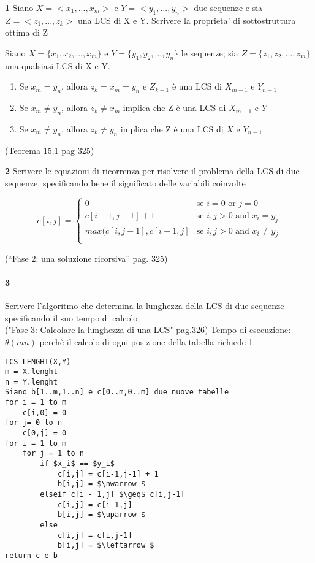 \documentclass[12pt, a4paper, openany]{book}
\newcommand{\domanda}[2]{\begin{box_domanda}\textbf{#1} #2\end{box_domanda}}
\newcommand{\risposta}[1]{#1}
\newcommand{\reflibro}[1]{(\small{#1})}
\begin{document}
\domanda{1}{
    Siano $X=<x_1,...,x_m>$ e $Y=< y_1,...,y_n>$ due sequenze e sia $Z=<z_1,...,z_k>$
    una LCS di X e Y. Scrivere la proprieta’ di sottostruttura ottima di Z    
}
\risposta{
    Siano $X=\{x_1,x_2,...,x_m\}$ e $Y=\{y_1,y_2,...,y_n\}$ le sequenze; sia $Z=\{z_1,z_2,...,z_m\}$ una qualsiasi LCS di X e Y.
\begin{enumerate}
    \item Se $x_m = y_n$, allora $z_k = x_m =y_n$ e $Z_{k-1}$ è  una LCS di $X_{m-1}$ e $Y_{n-1}$
    \item Se $x_m \neq y_n$, allora $z_k \neq x_m$ implica che Z è una LCS di $X_{m-1}$ e $Y$
    \item Se $x_m \neq y_n$, allora $z_k \neq y_n$ implica che Z è una LCS di $X$ e $Y_{n-1}$
\end{enumerate}
}

\reflibro{Teorema 15.1 pag 325}
\domanda{2}{
Scrivere le equazioni di ricorrenza per risolvere il problema della LCS di due
sequenze, specificando bene il significato delle variabili coinvolte 
}
\risposta{
\begin{equation*}
    c[i,j] = \begin{cases}
        0                      & \text{se $i = 0$ or $j = 0$}           \\
        c[i-1,j-1] + 1         & \text{se $i,j > 0$ and $x_i = y_j$}    \\
        max(c[i,j-1], c[i-1,j] & \text{se $i,j > 0$ and $x_i \neq y_j$} \\
    \end{cases}
\end{equation*}
}
\reflibro{“Fase 2: una soluzione ricorsiva” pag. 325}
\paragraph{3}
Scrivere l’algoritmo che determina la lunghezza della LCS di due sequenze
specificando il suo tempo di calcolo\\
("Fase 3: Calcolare la lunghezza di una LCS" pag.326)
Tempo di esecuzione: $\theta(mn)$ perchè il calcolo di ogni posizione della tabella richiede 1.

\begin{lstlisting}[mathescape=true]
LCS-LENGHT(X,Y)
m = X.lenght
n = Y.lenght
Siano b[1..m,1..n] e c[0..m,0..m] due nuove tabelle
for i = 1 to m
    c[i,0] = 0
for j= 0 to n
    c[0,j] = 0
for i = 1 to m
    for j = 1 to n
        if $x_i$ == $y_i$
            c[i,j] = c[i-1,j-1] + 1  
            b[i,j] = $\nwarrow $
        elseif c[i - 1,j] $\geq$ c[i,j-1]
            c[i,j] = c[i-1,j]  
            b[i,j] = $\uparrow $
        else
            c[i,j] = c[i,j-1]  
            b[i,j] = $\leftarrow $
return c e b
\end{lstlisting}
\end{document}
